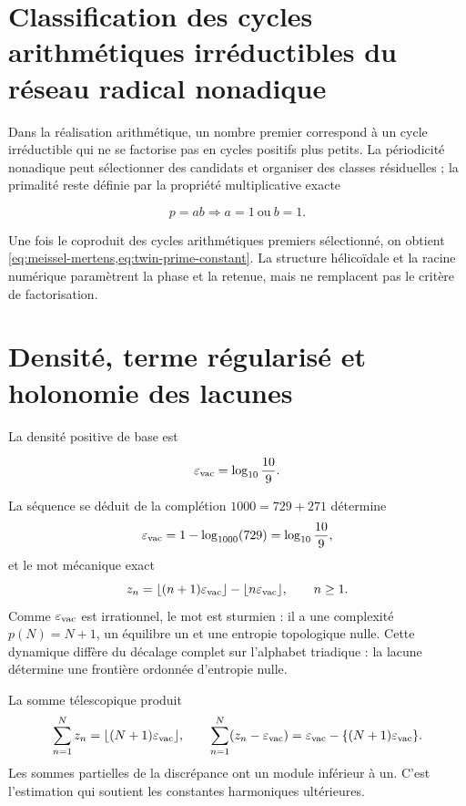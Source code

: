 \section{Classification des cycles arithmétiques irréductibles du réseau radical nonadique}

Dans la réalisation arithmétique, un nombre premier correspond à un cycle
irréductible qui ne se factorise pas en cycles positifs plus petits. La périodicité
nonadique peut sélectionner des candidats et organiser des classes résiduelles ; la
primalité reste définie par la propriété multiplicative exacte

\[
p=ab\Longrightarrow a=1\ \text{ou}\ b=1.
\]

Une fois le coproduit des cycles arithmétiques premiers sélectionné, on
obtient \cref{eq:meissel-mertens,eq:twin-prime-constant}. La structure
hélicoïdale et la racine numérique paramètrent la phase et la retenue, mais ne remplacent pas
le critère de factorisation.

\section{Densité, terme régularisé et holonomie des lacunes}

La densité positive de base est

\begin{equation}
\varepsilon_{\rm vac}=\log_{10}\frac{10}{9}.
\label{eq:vacancy-density}
\end{equation}

La séquence se déduit de la complétion
\(1000=729+271\) détermine
\begin{equation}
\varepsilon_{\rm vac}
=1-\log_{1000}(729)
=\log_{10}\frac{10}{9},
\label{eq:vacancy-density-two-forms}
\end{equation}
et le mot mécanique exact
\begin{equation}
z_n=\lfloor(n+1)\varepsilon_{\rm vac}\rfloor
-\lfloor n\varepsilon_{\rm vac}\rfloor,
\qquad n\ge1.
\label{eq:vacancy-mechanical-word}
\end{equation}
Comme \(\varepsilon_{\rm vac}\) est irrationnel, le mot est sturmien :
il a une complexité \(p(N)=N+1\), un équilibre un et une entropie topologique nulle.
Cette dynamique diffère du décalage complet sur l'alphabet
triadique : la lacune détermine une frontière ordonnée d'entropie nulle.

La somme télescopique produit
\begin{equation}
\sum_{n=1}^{N}z_n
=\lfloor(N+1)\varepsilon_{\rm vac}\rfloor,
\qquad
\sum_{n=1}^{N}(z_n-\varepsilon_{\rm vac})
=\varepsilon_{\rm vac}
-\{(N+1)\varepsilon_{\rm vac}\}.
\label{eq:vacancy-discrepancy}
\end{equation}
Les sommes partielles de la discrépance ont un module inférieur à un. C'est
l'estimation qui soutient les constantes harmoniques ultérieures.

